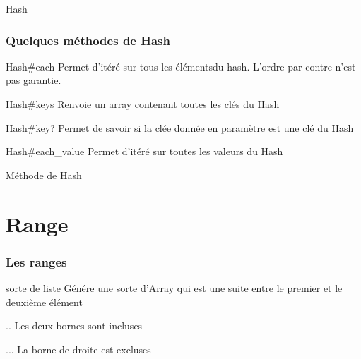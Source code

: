 \documentclass{beamer}
\begin{document}
\begin{frame}
  \begin{beamerboxesrounded}{Hash}
    
  \end{beamerboxesrounded}
\end{frame}

\begin{frame}
  \frametitle{Quelques m\'ethodes de Hash}
  \begin{block}{Hash\#each}
    Permet d'it\'er\'e sur tous les \'el\'ementsdu hash. L'ordre
    par contre n'est pas garantie.
  \end{block}
  \begin{block}{Hash\#keys}
    Renvoie un array contenant toutes les cl\'es du Hash
  \end{block}
  \begin{block}{Hash\#key?}
    Permet de savoir si la cl\'ee donn\'ee en paramètre est
    une cl\'e du Hash
  \end{block}
  \begin{block}{Hash\#each\_value}
    Permet d'it\'er\'e sur toutes les valeurs du Hash
  \end{block}
\end{frame}

\begin{frame}
  \begin{beamerboxesrounded}{M\'ethode de Hash}
    
  \end{beamerboxesrounded}
\end{frame}

\section{Range}

\begin{frame}
  \frametitle{Les ranges}
  \begin{block}{sorte de liste}
    G\'en\'ere une sorte d'Array qui est une suite entre le premier et
    le deuxième \'el\'ement
  \end{block}
  \begin{block}{..}
    Les deux bornes sont incluses
  \end{block}
  \begin{block}{...}
    La borne de droite est excluses
  \end{block}
\end{frame}
\end{document}
